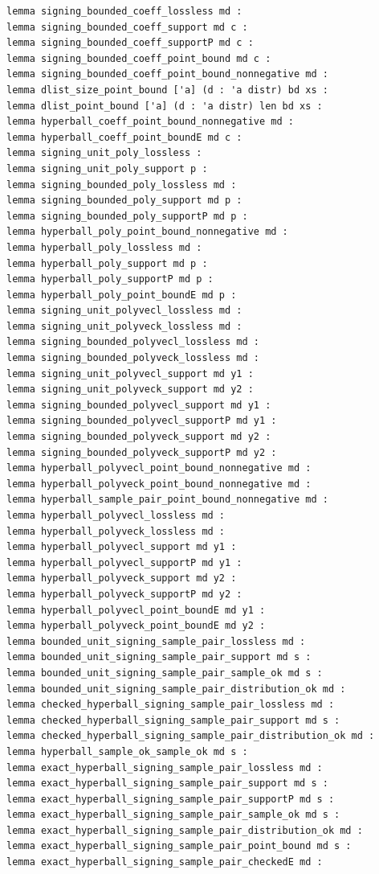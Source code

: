 \begin{lstlisting}[language=EasyCrypt,basicstyle=\ttfamily\tiny]
lemma signing_bounded_coeff_lossless md :
lemma signing_bounded_coeff_support md c :
lemma signing_bounded_coeff_supportP md c :
lemma signing_bounded_coeff_point_bound md c :
lemma signing_bounded_coeff_point_bound_nonnegative md :
lemma dlist_size_point_bound ['a] (d : 'a distr) bd xs :
lemma dlist_point_bound ['a] (d : 'a distr) len bd xs :
lemma hyperball_coeff_point_bound_nonnegative md :
lemma hyperball_coeff_point_boundE md c :
lemma signing_unit_poly_lossless :
lemma signing_unit_poly_support p :
lemma signing_bounded_poly_lossless md :
lemma signing_bounded_poly_support md p :
lemma signing_bounded_poly_supportP md p :
lemma hyperball_poly_point_bound_nonnegative md :
lemma hyperball_poly_lossless md :
lemma hyperball_poly_support md p :
lemma hyperball_poly_supportP md p :
lemma hyperball_poly_point_boundE md p :
lemma signing_unit_polyvecl_lossless md :
lemma signing_unit_polyveck_lossless md :
lemma signing_bounded_polyvecl_lossless md :
lemma signing_bounded_polyveck_lossless md :
lemma signing_unit_polyvecl_support md y1 :
lemma signing_unit_polyveck_support md y2 :
lemma signing_bounded_polyvecl_support md y1 :
lemma signing_bounded_polyvecl_supportP md y1 :
lemma signing_bounded_polyveck_support md y2 :
lemma signing_bounded_polyveck_supportP md y2 :
lemma hyperball_polyvecl_point_bound_nonnegative md :
lemma hyperball_polyveck_point_bound_nonnegative md :
lemma hyperball_sample_pair_point_bound_nonnegative md :
lemma hyperball_polyvecl_lossless md :
lemma hyperball_polyveck_lossless md :
lemma hyperball_polyvecl_support md y1 :
lemma hyperball_polyvecl_supportP md y1 :
lemma hyperball_polyveck_support md y2 :
lemma hyperball_polyveck_supportP md y2 :
lemma hyperball_polyvecl_point_boundE md y1 :
lemma hyperball_polyveck_point_boundE md y2 :
lemma bounded_unit_signing_sample_pair_lossless md :
lemma bounded_unit_signing_sample_pair_support md s :
lemma bounded_unit_signing_sample_pair_sample_ok md s :
lemma bounded_unit_signing_sample_pair_distribution_ok md :
lemma checked_hyperball_signing_sample_pair_lossless md :
lemma checked_hyperball_signing_sample_pair_support md s :
lemma checked_hyperball_signing_sample_pair_distribution_ok md :
lemma hyperball_sample_ok_sample_ok md s :
lemma exact_hyperball_signing_sample_pair_lossless md :
lemma exact_hyperball_signing_sample_pair_support md s :
lemma exact_hyperball_signing_sample_pair_supportP md s :
lemma exact_hyperball_signing_sample_pair_sample_ok md s :
lemma exact_hyperball_signing_sample_pair_distribution_ok md :
lemma exact_hyperball_signing_sample_pair_point_bound md s :
lemma exact_hyperball_signing_sample_pair_checkedE md :
\end{lstlisting}


